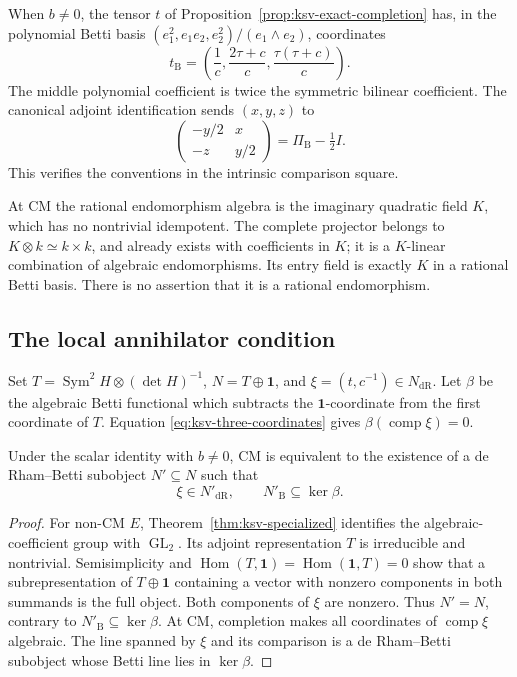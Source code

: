 When $b\ne0$, the tensor $t$ of
Proposition~\ref{prop:ksv-exact-completion} has, in the polynomial
Betti basis $(e_1^2,e_1e_2,e_2^2)/(e_1\wedge e_2)$, coordinates
\begin{equation}\label{eq:ksv-three-coordinates}
 t_{\mathrm B}
   =\left(\frac1c,\frac{2\tau+c}{c},
                       \frac{\tau(\tau+c)}c\right).
\end{equation}
The middle polynomial coefficient is twice the symmetric bilinear
coefficient.  The canonical adjoint identification sends $(x,y,z)$ to
\[
 \begin{pmatrix}-y/2&x\\-z&y/2\end{pmatrix}
       =\Pi_{\mathrm B}-\tfrac12I.
\]
This verifies the conventions in the intrinsic comparison square.

At CM the rational endomorphism algebra is the imaginary quadratic
field $K$, which has no nontrivial idempotent.  The complete projector
belongs to $K\otimes k\simeq k\times k$, and already exists with
coefficients in $K$; it is a $K$-linear combination of algebraic
endomorphisms.  Its entry field is exactly $K$ in a rational Betti
basis.  There is no assertion that it is a rational endomorphism.

\subsection{The local annihilator condition}
Set $T=\operatorname{Sym}^2H\otimes(\det H)^{-1}$,
$N=T\oplus\mathbf1$, and $\xi=(t,c^{-1})\in N_{\mathrm{dR}}$.
Let $\beta$ be the algebraic Betti functional which subtracts the
$\mathbf1$-coordinate from the first coordinate of $T$.  Equation
\eqref{eq:ksv-three-coordinates} gives
$\beta(\operatorname{comp}\xi)=0$.

\begin{proposition}\label{prop:ksv-local-lift}
Under the scalar identity with $b\ne0$, CM is equivalent to the
existence of a de Rham--Betti subobject $N'\subseteq N$ such that
\[
 \xi\in N'_{\mathrm{dR}},\qquad N'_{\mathrm B}\subseteq\ker\beta.
\]
\end{proposition}
\begin{proof}
For non-CM $E$, Theorem~\ref{thm:ksv-specialized} identifies the
algebraic-coefficient group with $\operatorname{GL}_2$.  Its adjoint
representation $T$ is irreducible and nontrivial.  Semisimplicity and
$\operatorname{Hom}(T,\mathbf1)=\operatorname{Hom}(\mathbf1,T)=0$
show that a subrepresentation of $T\oplus\mathbf1$ containing a
vector with nonzero components in both summands is the full object.
Both components of $\xi$ are nonzero.  Thus $N'=N$, contrary to
$N'_{\mathrm B}\subseteq\ker\beta$.
At CM, completion makes all coordinates of $\operatorname{comp}\xi$
algebraic.  The line spanned by $\xi$ and its comparison is a
de Rham--Betti subobject whose Betti line lies in $\ker\beta$.
\end{proof}

